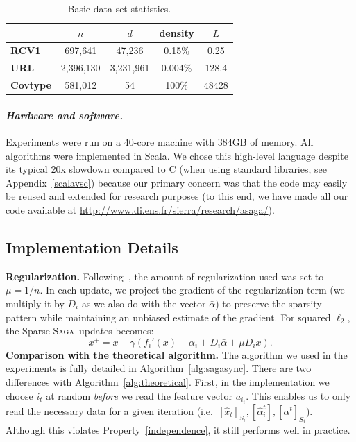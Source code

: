 \documentclass[twoside, 11pt]{article}
\newcommand{\lipschitz}{L}
\newcommand{\SAGA}{\textsc{Saga}}
\begin{document}
\begin{table}[ht]
	\caption{Basic data set statistics.}
	\centering
	\begin{tabular}{lcccc}
		\toprule
		{} & $n$ & $d$ & density & $\lipschitz$\\
		\midrule
		{\bf RCV1} & \hfill 697,641 & \hfill 47,236 & \hfill 0.15\% & \hfill 0.25\\
		{\bf URL} & \hfill 2,396,130 & \hfill 3,231,961 & \hfill 0.004\% & \hfill 128.4\\
		{\bf Covtype} & \hfill 581,012 & \hfill 54 & \hfill 100\% & \hfill 48428\\
		\bottomrule
	\end{tabular}
\end{table}

\paragraph{\textit{Hardware and software.}}
Experiments were run on a 40-core machine with 384GB of memory.
All algorithms were implemented in Scala. We chose this high-level language despite its typical 20x slowdown compared to C (when using standard libraries, see Appendix~\ref{scalavsc}) because our primary concern was that the code may easily be reused and extended for research purposes (to this end, we have made all our code available at \url{http://www.di.ens.fr/sierra/research/asaga/}).

\subsection{Implementation Details}
{\bf Regularization.}
Following~\citet{laggedsaga}, the amount of regularization used was set to $\mu=1 / n$.
In each update, we project the gradient of the regularization term (we multiply it by $D_i$ as we also do with the vector $\bar{\alpha}$) to preserve the sparsity pattern while maintaining an unbiased estimate of the gradient.
For squared $\ell_2$, the Sparse \SAGA\ updates becomes:
\begin{equation}
x^+ = x - \gamma (f_i'(x) - \alpha_i + D_i \bar{\alpha} + \mu D_i x).
\end{equation}
{\bf Comparison with the theoretical algorithm.}
The algorithm we used in the experiments is fully detailed in Algorithm~\ref{alg:sagasync}.
There are two differences with Algorithm~\ref{alg:theoretical}.
First, in the implementation we choose $i_t$ at random \textit{before} we read the feature vector $a_{i_t}$.
This enables us to only read the necessary data for a given iteration (i.e.~$[\hat x_t]_{S_i}, [\hat \alpha_i^t], [\bar \alpha^t]_{S_i}$).
Although this violates Property~\ref{independence}, it still performs well in practice.
\end{document}
